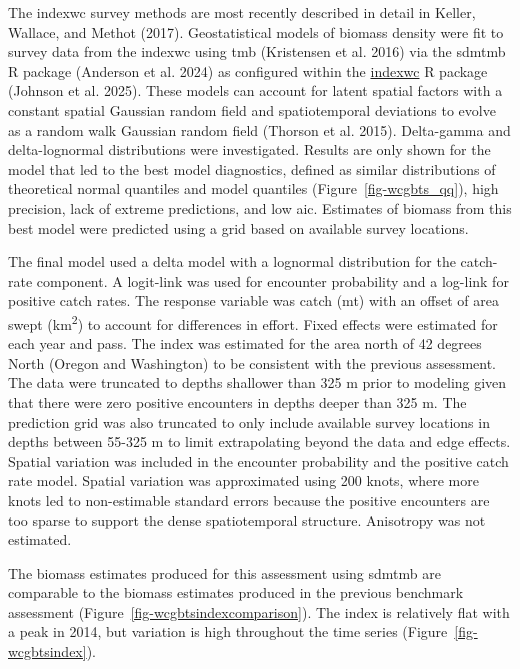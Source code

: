 \documentclass[
]{scrartcl}
\begin{document}
The \gls{indexwc} survey methods are most recently described in detail
in Keller, Wallace, and Methot (2017). Geostatistical models of biomass
density were fit to survey data from the \gls{indexwc} using \gls{tmb}
(Kristensen et al. 2016) via the \gls{sdmtmb} R package (Anderson et al.
2024) as configured within the
\href{https://github.com/pfmc-assessments/indexwc}{indexwc} R package
(Johnson et al. 2025). These models can account for latent spatial
factors with a constant spatial Gaussian random field and spatiotemporal
deviations to evolve as a random walk Gaussian random field (Thorson et
al. 2015). Delta-gamma and delta-lognormal distributions were
investigated. Results are only shown for the model that led to the best
model diagnostics, defined as similar distributions of theoretical
normal quantiles and model quantiles (Figure~\ref{fig-wcgbts_qq}), high
precision, lack of extreme predictions, and low \gls{aic}. Estimates of
biomass from this best model were predicted using a grid based on
available survey locations.

The final model used a delta model with a lognormal distribution for the
catch-rate component. A logit-link was used for encounter probability
and a log-link for positive catch rates. The response variable was catch
(mt) with an offset of area swept (km\textsuperscript{2}) to account for
differences in effort. Fixed effects were estimated for each year and
pass. The index was estimated for the area north of 42 degrees North
(Oregon and Washington) to be consistent with the previous assessment.
The data were truncated to depths shallower than 325 m prior to modeling
given that there were zero positive encounters in depths deeper than 325
m. The prediction grid was also truncated to only include available
survey locations in depths between 55-325 m to limit extrapolating
beyond the data and edge effects. Spatial variation was included in the
encounter probability and the positive catch rate model. Spatial
variation was approximated using 200 knots, where more knots led to
non-estimable standard errors because the positive encounters are too
sparse to support the dense spatiotemporal structure. Anisotropy was not
estimated.

The biomass estimates produced for this assessment using \gls{sdmtmb}
are comparable to the biomass estimates produced in the previous
benchmark assessment (Figure~\ref{fig-wcgbtsindexcomparison}). The index
is relatively flat with a peak in 2014, but variation is high throughout
the time series (Figure~\ref{fig-wcgbtsindex}).
\end{document}
